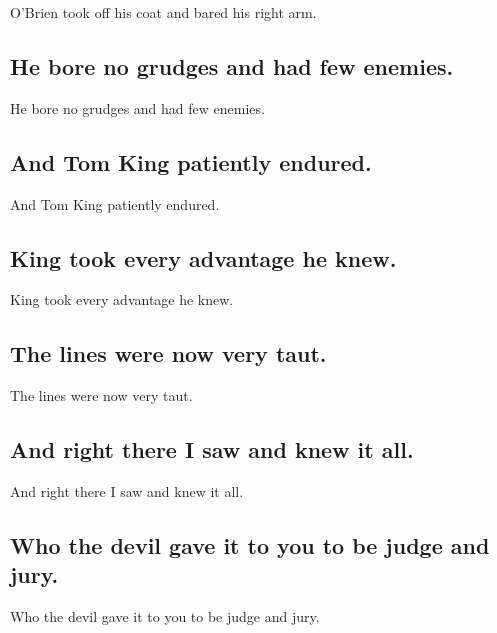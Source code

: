 \documentclass[]{article}
\begin{document}
O'Brien took off his coat and bared his right arm.

\hypertarget{he-bore-no-grudges-and-had-few-enemies.}{%
\subsection{He bore no grudges and had few
enemies.}\label{he-bore-no-grudges-and-had-few-enemies.}}

He bore no grudges and had few enemies.

\hypertarget{and-tom-king-patiently-endured.}{%
\subsection{And Tom King patiently
endured.}\label{and-tom-king-patiently-endured.}}

And Tom King patiently endured.

\hypertarget{king-took-every-advantage-he-knew.}{%
\subsection{King took every advantage he
knew.}\label{king-took-every-advantage-he-knew.}}

King took every advantage he knew.

\hypertarget{the-lines-were-now-very-taut.}{%
\subsection{The lines were now very
taut.}\label{the-lines-were-now-very-taut.}}

The lines were now very taut.

\hypertarget{and-right-there-i-saw-and-knew-it-all.}{%
\subsection{And right there I saw and knew it
all.}\label{and-right-there-i-saw-and-knew-it-all.}}

And right there I saw and knew it all.

\hypertarget{who-the-devil-gave-it-to-you-to-be-judge-and-jury.}{%
\subsection{Who the devil gave it to you to be judge and
jury.}\label{who-the-devil-gave-it-to-you-to-be-judge-and-jury.}}

Who the devil gave it to you to be judge and jury.
\end{document}

